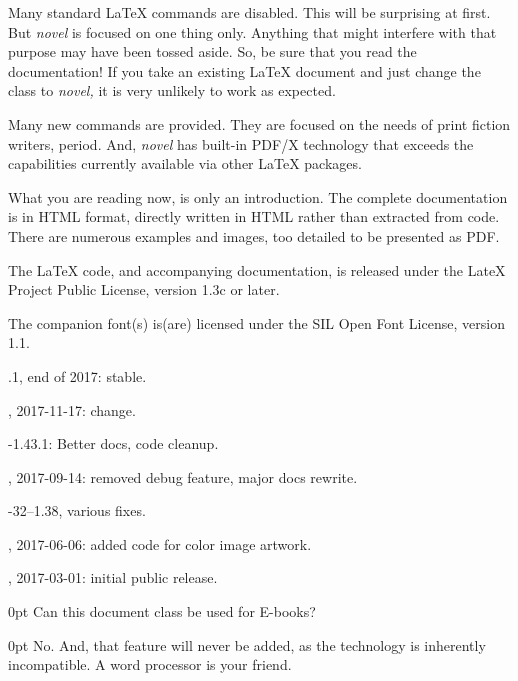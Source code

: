 \documentclass{novel} %
\begin{document}
Many standard LaTeX commands are disabled. This will be surprising at first. But \emph{novel} is focused on one thing only. Anything that might interfere with that purpose may have been tossed aside. So, be sure that you read the documentation! If you take an existing LaTeX document and just change the class to \emph{novel,} it is very unlikely to work as expected.

Many new commands are provided. They are focused on the needs of print fiction writers, period. And, \emph{novel} has built-in PDF/X technology that exceeds the capabilities currently available via other LaTeX packages.


What you are reading now, is only an introduction. The complete documentation is in HTML format, directly written in HTML rather than extracted from code. There are numerous examples and images, too detailed to be presented as PDF.


The LaTeX code, and accompanying documentation, is released under the LateX Project Public License, version 1.3c or later.

The companion font(s) is(are) licensed under the SIL Open Font License, version 1.1.




.1, end of 2017: stable.

, 2017-11-17: \string\BlockImage\space change.

-1.43.1: Better docs, code cleanup.

, 2017-09-14: removed debug feature, major docs rewrite.

-32--1.38, various fixes.

, 2017-06-06: added code for color image artwork.

, 2017-03-01: initial public release.

\clearpage


\begin{adjustwidth}{\parindent}{0pt}
\backindent{}Can this document class be used for E-books?
\end{adjustwidth}
\begin{adjustwidth}{\parindent}{0pt}
\backindent{}No. And, that feature will never be added, as the technology is inherently incompatible. A word processor is your friend.
\end{adjustwidth}
\end{document}
